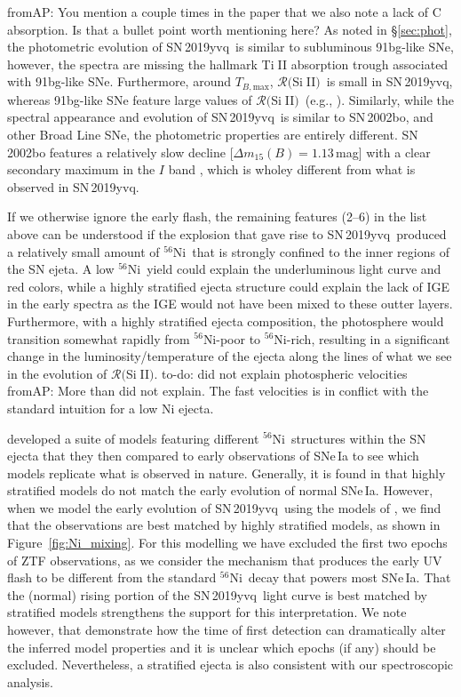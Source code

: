 \documentclass[twocolumn]{aastex63}
\def\ion#1#2{#1$\;${\footnotesize\rm{#2}}\relax}
\newcommand{\fromabi}[1]{{\color{teal} fromAP: {#1}}}
\newcommand{\todo}[1]{{\color{magenta} to-do: {#1}}}
\newcommand{\tbmax}{$T_{B,\mathrm{max}}$}
\newcommand{\RSiII}{$\mathcal{R}($\ion{Si}{II}$)$}
\newcommand{\radni}{$^{56}$Ni}
\newcommand{\sn}{SN\,2019yvq}
\begin{document}
\fromabi{You mention a couple times in the paper that we also note a lack of C absorption. Is that a bullet point worth mentioning here?}
As noted in \S\ref{sec:phot}, the photometric evolution of \sn\ is similar to
subluminous 91bg-like SNe, however, the spectra are missing the hallmark
\ion{Ti}{II} absorption trough associated with 91bg-like SNe. Furthermore,
around \tbmax, \RSiII\ is small in \sn, whereas 91bg-like SNe feature large
values of \RSiII\ (e.g., \citealt{Branch09}). Similarly, while the spectral
appearance and evolution of \sn\ is similar to SN\,2002bo, and other
\citeauthor{Branch06} Broad Line SNe, the photometric properties are entirely
different. SN\,2002bo features a relatively slow decline [$\Delta{m}_{15}(B) =
1.13$\,mag] with a clear secondary maximum in the $I$ band \citep{Benetti04},
which is wholey different from what is observed in \sn.

If we otherwise ignore the early flash, the remaining features (2--6) in the
list above can be understood if the explosion that gave rise to \sn\ produced
a relatively small amount of \radni\ that is strongly confined to the inner
regions of the SN ejeta. A low \radni\ yield could explain the underluminous
light curve and red colors, while a highly stratified ejecta structure could
explain the lack of IGE in the early spectra as the IGE would not have been
mixed to these outter layers. Furthermore, with a highly stratified ejecta
composition, the photosphere would transition somewhat rapidly from
\radni-poor to \radni-rich, resulting in a significant change in the
luminosity/temperature of the ejecta along the lines of what we see in the
evolution of \RSiII. \todo{did not explain photospheric velocities}\fromabi{More than did not explain. The fast velocities is in conflict with the standard intuition for a low Ni ejecta.}

\citet{Magee20} developed a suite of models featuring different \radni\
structures within the SN ejecta that they then compared to early observations
of SNe\,Ia to see which models replicate what is observed in nature.
Generally, it is found in \citet{Magee20} that highly stratified models do not
match the early evolution of normal SNe\,Ia. However, when we model the early
evolution of \sn\ using the models of \citet{Magee20}, we find that the
observations are best matched by highly stratified models, as shown in
Figure~\ref{fig:Ni_mixing}. For this modelling we have excluded the first two
epochs of ZTF observations, as we consider the mechanism that produces the
early UV flash to be different from the standard \radni\ decay that powers
most SNe\,Ia. That the (normal) rising portion of the \sn\ light curve is best
matched by stratified models strengthens the support for this interpretation. We note however, that \cite{Magee20} demonstrate how the time of first detection can dramatically alter the inferred model properties and it is unclear which epochs (if any) should be excluded. Nevertheless, a stratified ejecta is also consistent with our spectroscopic analysis.
\end{document}

